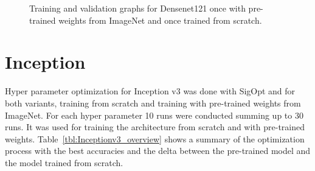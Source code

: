 \begin{figure}[!h]
\centering
\caption{Training and validation graphs for Densenet121 once with pre-trained weights from ImageNet and once trained from scratch.}
\label{fig:densenet121-graph}
\end{figure}

\quad










\section{Inception}


Hyper parameter optimization for Inception v3 was done with SigOpt and for both variants, training from scratch and training with pre-trained weights from ImageNet. For each hyper parameter 10 runs were conducted summing up to 30 runs. It was used for training the architecture from scratch and with pre-trained weights. Table~\ref{tbl:Inceptionv3_overview} shows a summary of the optimization process with the best accuracies and the delta between the pre-trained model and the model trained from scratch. \\


